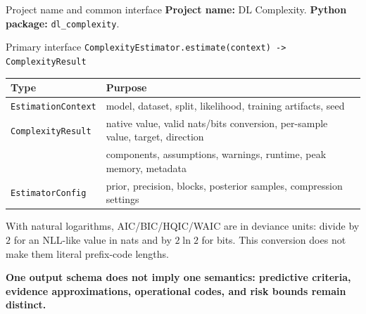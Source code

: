 \documentclass[aspectratio=169,notheorems]{beamer}
\newcommand{\code}[1]{\texttt{#1}}
\newcommand{\take}[1]{%
  \par\vspace{0.35em}{\color{myblue}\hrule height 0.6pt}%
  \vspace{0.25em}\noindent\textbf{#1}\par}
\begin{document}
\begin{frame}[shrink=4]{Project name and common interface}
\small
\textbf{Project name:} DL Complexity. \hfill
\textbf{Python package:} \code{dl\_complexity}.

\medskip
\begin{block}{Primary interface}
\code{ComplexityEstimator.estimate(context) -> ComplexityResult}
\end{block}

\renewcommand{\arraystretch}{1.16}
\begin{tabular}{@{}L{0.27\textwidth}L{0.67\textwidth}@{}}
\toprule
\textbf{Type} & \textbf{Purpose} \\
\midrule
\code{EstimationContext} & model, dataset, split, likelihood, training artifacts, seed \\
\code{ComplexityResult} & native value, valid nats/bits conversion, per-sample value,
target, direction \\
 & components, assumptions, warnings, runtime, peak memory, metadata \\
\code{EstimatorConfig} & prior, precision, blocks, posterior samples, compression settings \\
\bottomrule
\end{tabular}

\medskip
With natural logarithms, AIC/BIC/HQIC/WAIC are in deviance units: divide by $2$ for an
NLL-like value in nats and by $2\ln 2$ for bits. This conversion does not make them
literal prefix-code lengths.

\take{One output schema does not imply one semantics: predictive criteria, evidence
approximations, operational codes, and risk bounds remain distinct.}
\end{frame}
\end{document}

